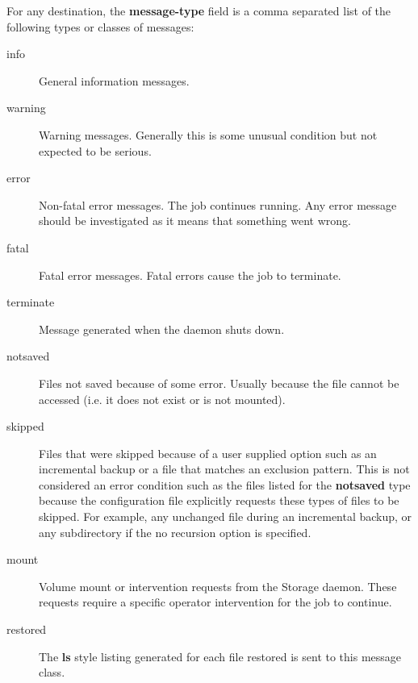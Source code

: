 \begin{description}
\begin{description}
\end{description}

   For any destination, the {\bf message-type} field is a comma separated
   list of the following types or classes of messages:

\begin{description}

\item [info]
   General information messages.  

\item [warning]
   Warning messages. Generally this is some  unusual condition but not expected
   to be serious. 

\item [error]
   Non-fatal error messages. The job continues running.  Any error message should
   be investigated as it means that something  went wrong.  

\item [fatal]
   Fatal error messages. Fatal errors cause the  job to terminate.  

\item [terminate]
   Message generated when the daemon shuts down.  

\item [notsaved]
   Files not saved because of some error.  Usually because the file cannot be
   accessed (i.e. it does not  exist or is not mounted).  

\item [skipped]
   Files that were skipped because of a user supplied option such as an
   incremental backup or a file that matches an exclusion pattern.  This is
   not considered an error condition such as the files listed for the {\bf
   notsaved} type because the configuration file explicitly requests these
   types of files to be skipped.  For example, any unchanged file during an
   incremental backup, or any subdirectory if the no recursion option is
   specified.

\item [mount]
   Volume mount or intervention requests from the Storage daemon.  These
   requests require a specific operator intervention for the job to
   continue.

\item [restored]
   The {\bf ls} style listing generated for each file restored is sent to
   this message class.


\end{description}
\end{description}

